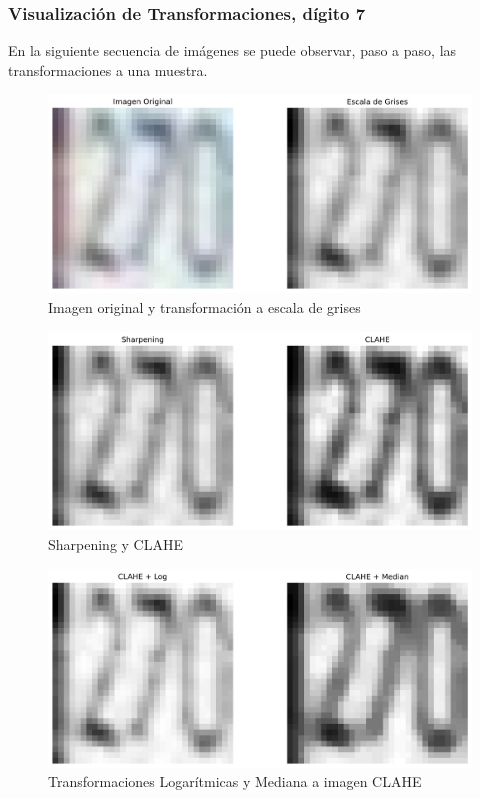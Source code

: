 \documentclass[journal]{IEEEtran}
\begin{document}
\subsubsection{Visualización de Transformaciones, dígito 7}
En la siguiente secuencia de imágenes se puede observar, paso a paso, las transformaciones a una muestra.

\begin{figure}[H]
        \centering
        \includegraphics[width=\linewidth]{figures/row_1_images.png}
        \caption{Imagen original y transformación a escala de grises}
        \label{fig:row_1}
\end{figure}

\begin{figure}[H]
        \centering
        \includegraphics[width=\linewidth]{figures/row_2_images.png}
        \caption{Sharpening y CLAHE}
        \label{fig:row_2}
\end{figure}

\begin{figure}[H]
        \centering
        \includegraphics[width=\linewidth]{figures/row_3_images.png}
        \caption{Transformaciones Logarítmicas y Mediana a imagen CLAHE}
        \label{fig:row_3}
\end{figure}
\end{document}
